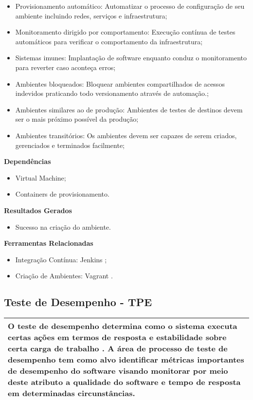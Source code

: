 \begin{itemize}
    \item Provisionamento automático: Automatizar o processo de configuração de seu ambiente incluindo redes, serviços e infraestrutura;
    \item Monitoramento dirigido por comportamento: Execução contínua de testes automáticos para verificar o comportamento da infraestrutura;
    \item Sistemas imunes: Implantação de software enquanto conduz o monitoramento para reverter caso aconteça erros;
    \item Ambientes bloqueados: Bloquear ambientes compartilhados de acessos indevidos praticando todo versionamento através de automação.;
    \item Ambientes similares ao de produção: Ambientes de testes de destinos devem ser o mais próximo possível da produção;
    \item Ambientes transitórios: Os ambientes devem ser capazes de serem criados, gerenciados e terminados facilmente;
\end{itemize}

\textbf{Dependências}
\begin{itemize}
    \item Virtual Machine;
    \item Containers de provisionamento.
\end{itemize}

\textbf{ Resultados Gerados}
\begin{itemize}
    \item Sucesso na criação do ambiente.
\end{itemize}

\textbf{Ferramentas Relacionadas}
\begin{itemize}
    \item Integração Contínua: Jenkins \cite{Jenkins};
    \item Criação de Ambientes:  Vagrant \cite{Vagrant}.
\end{itemize}


\subsection{Teste de Desempenho - TPE}
\label{sec:tpe}

\begin{table}[H]
\centering
\begin{tabular}{|p{130mm}|}
\hline
O teste de desempenho determina como o sistema executa certas ações em termos de resposta e estabilidade sobre certa carga de trabalho \cite{Molyneaux2009}. A área de processo de teste de desempenho tem como alvo identificar métricas importantes de desempenho do software visando monitorar por meio deste atributo a qualidade do software e tempo de resposta em determinadas circunstâncias.\\
\hline
\end{tabular}
\end{table}

